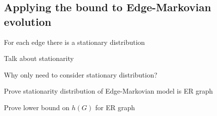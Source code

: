 \documentclass[a4paper,11pt]{article}
\theoremstyle{definition}
\begin{document}
\subsection{Applying the bound to Edge-Markovian evolution}

For each edge there is a stationary distribution

Talk about stationarity

Why only need to consider stationary distribution?

Prove stationarity distribution of Edge-Markovian model is ER graph

Prove lower bound on $h(G)$ for ER graph
\end{document}
